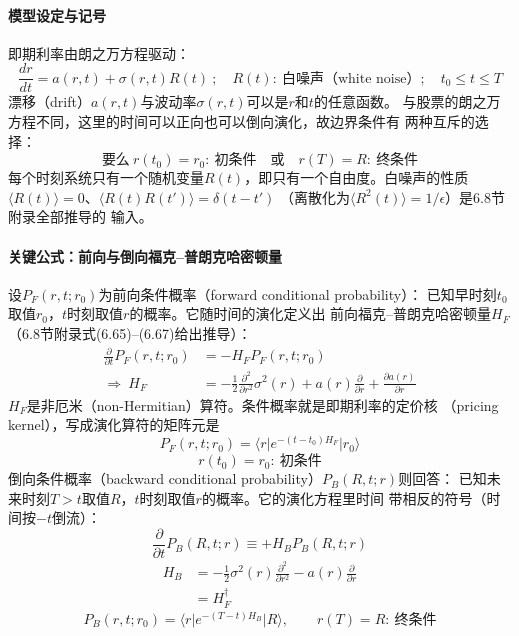 \paragraph{模型设定与记号}
即期利率由朗之万方程驱动：
\begin{equation*}
\frac{dr}{dt}=a(r,t)+\sigma(r,t)R(t)\ ;\quad R(t):\ \text{白噪声（white noise）};\quad t_0\leq t\leq T
\tag{6.1}
\end{equation*}
漂移（drift）$a(r,t)$与波动率$\sigma(r,t)$可以是$r$和$t$的任意函数。
与股票的朗之万方程不同，这里的时间可以正向也可以倒向演化，故边界条件有
两种互斥的选择：
\begin{equation*}
\text{要么}\ r(t_0)=r_0:\ \text{初条件}\quad \text{或}\quad r(T)=R:\ \text{终条件}
\tag{6.2}
\end{equation*}
每个时刻系统只有一个随机变量$R(t)$，即只有一个自由度。白噪声的性质
$\langle R(t)\rangle=0$、$\langle R(t)R(t')\rangle=\delta(t-t')$
（离散化为$\langle R^2(t)\rangle=1/\epsilon$）是6.8节附录全部推导的
输入。

\paragraph{关键公式：前向与倒向福克--普朗克哈密顿量}
设$P_F(r,t;r_0)$为前向条件概率（forward conditional probability）：
已知早时刻$t_0$取值$r_0$，$t$时刻取值$r$的概率。它随时间的演化定义出
前向福克--普朗克哈密顿量$H_F$（6.8节附录式(6.65)--(6.67)给出推导）：
\begin{align*}
\frac{\partial}{\partial t}P_F(r,t;r_0)&=-H_FP_F(r,t;r_0)\\
\Rightarrow\ H_F&=-\frac{1}{2}\frac{\partial^2}{\partial r^2}\sigma^2(r)
+a(r)\frac{\partial}{\partial r}+\frac{\partial a(r)}{\partial r}
\tag{6.3}
\end{align*}
$H_F$是非厄米（non-Hermitian）算符。条件概率就是即期利率的定价核
（pricing kernel），写成演化算符的矩阵元是
\begin{equation*}
P_F(r,t;r_0)=\langle r\vert e^{-(t-t_0)H_F}\vert r_0\rangle
\tag{6.4}
\end{equation*}
\begin{equation*}
r(t_0)=r_0:\ \text{初条件}
\tag{6.5}
\end{equation*}
倒向条件概率（backward conditional probability）$P_B(R,t;r)$则回答：
已知未来时刻$T>t$取值$R$，$t$时刻取值$r$的概率。它的演化方程里时间
带相反的符号（时间按$-t$倒流）：
\begin{equation*}
\frac{\partial}{\partial t}P_B(R,t;r)\equiv+H_BP_B(R,t;r)
\tag{6.6}
\end{equation*}
\begin{align*}
H_B&=-\frac{1}{2}\sigma^2(r)\frac{\partial^2}{\partial r^2}
-a(r)\frac{\partial}{\partial r}\\
&=H_F^{\dagger}
\tag{6.7}
\end{align*}
\begin{equation*}
P_B(r,t;r_0)=\langle r\vert e^{-(T-t)H_B}\vert R\rangle,\qquad
r(T)=R:\ \text{终条件}
\tag{6.8}
\end{equation*}

